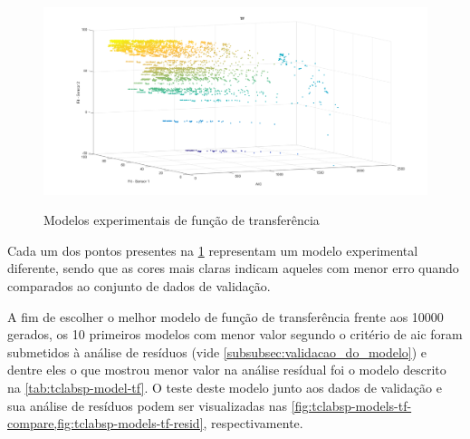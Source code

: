 \begin{figure}[h]
	\caption{Modelos experimentais de função de transferência}
	\begin{center}
		\includegraphics[width=1.00\textwidth]{./5_images/tclabsp-models-TF.png} 
		\label{fig:tclabsp-models-tf}
	\end{center}
	\centering
\end{figure}

Cada um dos pontos presentes na \cref{fig:tclabsp-models-tf} representam um modelo experimental diferente, sendo que as cores
mais claras indicam aqueles com menor erro quando comparados ao conjunto de dados de validação.

A fim de escolher o melhor modelo de função de transferência frente aos 10000 gerados, os 10 primeiros modelos com menor 
valor segundo o critério de \acrshort{aic} foram submetidos à análise de resíduos (vide \cref{subsubsec:validacao_do_modelo}) e
dentre eles o que mostrou menor valor na análise resídual foi o modelo descrito na \cref{tab:tclabsp-model-tf}.
O teste deste modelo junto aos dados de validação e sua análise de resíduos podem ser visualizadas nas
\cref{fig:tclabsp-models-tf-compare,fig:tclabsp-models-tf-resid}, respectivamente.

